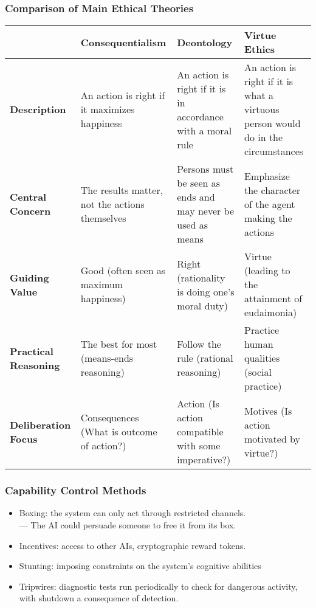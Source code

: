 \documentclass[UTF8,11pt,colorlinks,compress,openany]{beamer}%
\begin{document}
\begin{frame}\frametitle{Comparison of Main Ethical Theories}\small
\begin{table}[H]
\begin{tabu}{p{0.15\textwidth}|p{0.21\textwidth}|p{0.23\textwidth}|p{0.25\textwidth}}
\hline
& \textbf{Consequentialism} & \textbf{Deontology} & \textbf{Virtue Ethics}\\
\hline
\textbf{Description} & An action is right if it maximizes happiness & An action is right if it is in accordance with a moral rule & An action is right if it
is what a virtuous person would do in the circumstances\\
\hline
\textbf{Central Concern} & The results matter, not the actions themselves & Persons must be seen as ends and may never be used as means & Emphasize the character of the agent making the actions\\
\hline
\textbf{Guiding Value} & Good (often seen as maximum happiness) & Right (rationality is doing one's moral duty) & Virtue (leading to the attainment of eudaimonia)\\
\hline
\textbf{Practical Reasoning} & The best for most (means-ends reasoning) & Follow the rule (rational reasoning) & Practice human qualities (social practice)\\
\hline
\textbf{Deliberation Focus} & Consequences (What is outcome of action?) & Action (Is action compatible with some imperative?) & Motives (Is action motivated by virtue?)\\
\hline
\end{tabu}
\end{table}
\end{frame}

\begin{frame}\frametitle{Capability Control Methods}
\begin{itemize}
	\item Boxing: the system can only act through restricted channels.\\
	--- The AI could persuade someone to free it from its box.
	\item Incentives: access to other AIs, cryptographic reward tokens.
	\item Stunting: imposing constraints on the system's cognitive abilities
	\item Tripwires: diagnostic tests run periodically to check for dangerous activity, with shutdown a consequence of detection.
\end{itemize}
\end{frame}
\end{document}
